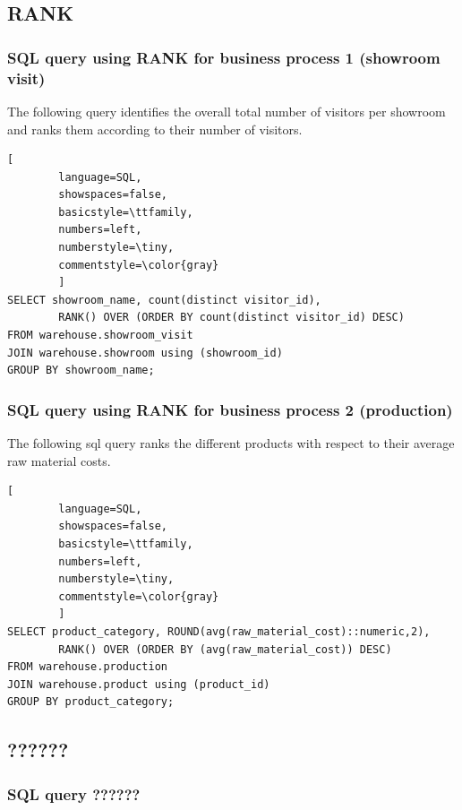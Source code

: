 \documentclass[letterpaper,12pt]{article}
\begin{document}
\subsection{RANK}

\subsubsection{SQL query using RANK for business process 1 (showroom visit)}

The following query identifies the overall total number of visitors per showroom and ranks them according to their number of visitors.

\begin{lstlisting}[
        language=SQL,
        showspaces=false,
        basicstyle=\ttfamily,
        numbers=left,
        numberstyle=\tiny,
        commentstyle=\color{gray}
        ]
SELECT showroom_name, count(distinct visitor_id), 
        RANK() OVER (ORDER BY count(distinct visitor_id) DESC)
FROM warehouse.showroom_visit
JOIN warehouse.showroom using (showroom_id)
GROUP BY showroom_name;
\end{lstlisting}

\subsubsection{SQL query using RANK for business process 2 (production)}

The following sql query ranks the different products with respect to their average raw material costs.

\begin{lstlisting}[
        language=SQL,
        showspaces=false,
        basicstyle=\ttfamily,
        numbers=left,
        numberstyle=\tiny,
        commentstyle=\color{gray}
        ]
SELECT product_category, ROUND(avg(raw_material_cost)::numeric,2),
        RANK() OVER (ORDER BY (avg(raw_material_cost)) DESC)
FROM warehouse.production
JOIN warehouse.product using (product_id)
GROUP BY product_category;
\end{lstlisting}
                
\subsection{??????}

\subsubsection{SQL query ??????}
\end{document}

